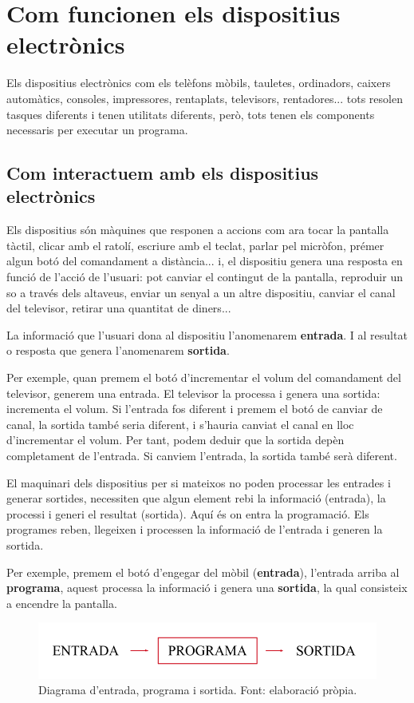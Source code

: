 \section{Com funcionen els dispositius electrònics}
Els dispositius electrònics com els telèfons mòbils, tauletes, ordinadors, caixers automàtics, consoles, impressores, rentaplats, televisors, rentadores... tots resolen tasques diferents i tenen utilitats diferents, però, tots tenen els components necessaris per executar un programa.

\subsection{Com interactuem amb els dispositius electrònics}
Els dispositius són màquines que responen a accions com ara tocar la pantalla tàctil, clicar amb el ratolí, escriure amb el teclat, parlar pel micròfon, prémer algun botó del comandament a distància... i, el dispositiu genera una resposta en funció de l'acció de l'usuari: pot canviar el contingut de la pantalla, reproduir un so a través dels altaveus, enviar un senyal a un altre dispositiu, canviar el canal del televisor, retirar una quantitat de diners...

La informació que l'usuari dona al dispositiu l'anomenarem \textbf{entrada}. I al resultat o resposta que genera l'anomenarem \textbf{sortida}. 

Per exemple, quan premem el botó d'incrementar el volum del comandament del televisor, generem una entrada. El televisor la processa i genera una sortida: incrementa el volum. Si l'entrada fos diferent i premem el botó de canviar de canal, la sortida també seria diferent, i s'hauria canviat el canal en lloc d'incrementar el volum. Per tant, podem deduir que la sortida depèn completament de l'entrada. Si canviem l'entrada, la sortida també serà diferent.

El maquinari dels dispositius per si mateixos no poden processar les entrades i generar sortides, necessiten que algun element rebi la informació (entrada), la processi i generi el resultat (sortida). Aquí és on entra la programació. Els programes reben, llegeixen i processen la informació de l'entrada i generen la sortida.

Per exemple, premem el botó d'engegar del mòbil (\textbf{entrada}), l'entrada arriba al \textbf{programa}, aquest processa la informació i genera una \textbf{sortida}, la qual consisteix a encendre la pantalla.

\begin{figure}[h]
    \centering
    \includegraphics[width=.7\textwidth]{capitols/figures/i_o prog.png}
    \caption[Diagrama d'entrada, programa i sortida.]{Diagrama d'entrada, programa i sortida. Font: elaboració pròpia.}
    \label{Figura}
\end{figure}

